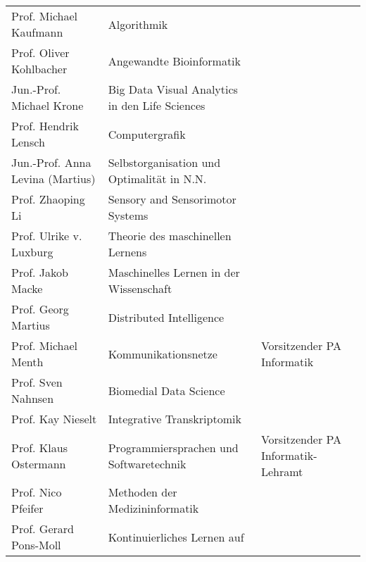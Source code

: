 \begin{tabular}{|lll|}
	Prof. Michael Kaufmann           & Algorithmik                                           &                                          \\
	Prof. Oliver Kohlbacher          & Angewandte Bioinformatik                              &                                          \\
	Jun.-Prof. Michael Krone         & Big Data Visual Analytics in den Life Sciences        &                                          \\
	Prof. Hendrik Lensch             & Computergrafik                                        &                                          \\
	Jun.-Prof. Anna Levina (Martius) & Selbstorganisation und Optimalität in N.N.            &                                          \\
	Prof. Zhaoping Li                & Sensory and Sensorimotor Systems                      &                                          \\
	Prof. Ulrike v. Luxburg          & Theorie des maschinellen Lernens                      &                                          \\
	Prof. Jakob Macke                & Maschinelles Lernen in der Wissenschaft               &                                          \\
	Prof. Georg Martius              & Distributed Intelligence                              &                                          \\
	Prof. Michael Menth              & Kommunikationsnetze                                   & Vorsitzender PA Informatik               \\
	Prof. Sven Nahnsen               & Biomedial Data Science                                &                                          \\
	Prof. Kay Nieselt                & Integrative Transkriptomik                            &                                          \\
	Prof. Klaus Ostermann            & Programmiersprachen und Softwaretechnik               & Vorsitzender PA Informatik-Lehramt       \\
	Prof. Nico Pfeifer               & Methoden der Medizininformatik                        &                                          \\
	Prof. Gerard Pons-Moll           & Kontinuierliches Lernen auf                           &                                          \\

\end{tabular}
